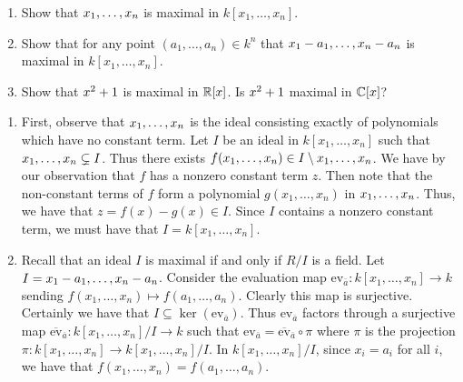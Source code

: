 \documentclass[letterpaper, 11pt, oneside]{book}
\begin{document}
\begin{exercise}\label{ex:UAG_1.1.9}
  \begin{enumerate}[label= (\alph*)]
    \item Show that $\ideal{x_{1}, \ldots, x_{n}}$ is maximal in $k[x_{1}, \ldots, x_{n}]$.
    \item Show that for any point $(a_{1}, \ldots, a_{n}) \in k^{n}$ that $\ideal{x_{1} - a_{1}, \ldots, x_{n} - a_{n}}$ is maximal in $k[x_{1}, \ldots, x_{n}]$.
    \item Show that $\ideal{x^{2} + 1}$ is maximal in $\mathbb{R}[x]$.
          Is $\ideal{x^{2} + 1}$ maximal in $\mathbb{C}[x]$?
  \end{enumerate}
\end{exercise}
\begin{pf}
  \begin{enumerate}[label= (\alph*)]
    \item First, observe that $\ideal{x_{1}, \ldots, x_{n}}$ is the ideal consisting exactly of polynomials which have no constant term.
          Let $I$ be an ideal in $k[x_{1}, \ldots, x_{n}]$ such that $\ideal{x_{1}, \ldots, x_{n}} \subsetneq I$.
          Thus there exists $f(x_{1}, \ldots, x_{n}) \in I \setminus \ideal{x_{1}, \ldots, x_{n}}$.
          We have by our observation that $f$ has a nonzero constant term $z$.
          Then note that the non-constant terms of $f$ form a polynomial $g(x_{1}, \ldots, x_{n})$ in $\ideal{x_{1}, \ldots, x_{n}}$.
          Thus, we have that $z = f(x) - g(x) \in I$.
          Since $I$ contains a nonzero constant term, we must have that $I = k[x_{1}, \ldots, x_{n}]$.
    \item Recall that an ideal $I$ is maximal if and only if $R/I$ is a field.
          Let $I = \ideal{x_{1} - a_{1}, \ldots, x_{n} - a_{n}}$.
          Consider the evaluation map $\text{ev}_{\overline{a}}\colon k[x_{1}, \ldots, x_{n}] \to k$ sending $f(x_{1}, \ldots, x_{n}) \mapsto f(a_{1}, \ldots, a_{n})$.
          Clearly this map is surjective.
          Certainly we have that $I \subseteq \ker(\text{ev}_{\overline{a}})$.
          Thus $\text{ev}_{\overline{a}}$ factors through a surjective map $\overline{\text{ev}}_{\overline{a}}\colon k[x_{1}, \ldots, x_{n}]/I \to k$ such that $\text{ev}_{\overline{a}} = \overline{\text{ev}}_{\overline{a}} \circ \pi$ where $\pi$ is the projection $\pi\colon k[x_{1}, \ldots, x_{n}] \to k[x_{1}, \ldots, x_{n}] / I$.
          In $k[x_{1}, \ldots, x_{n}] / I$, since $x_{i} = a_{i}$ for all $i$, we have that $f(x_{1}, \ldots, x_{n}) = f(a_{1}, \ldots, a_{n})$.

\end{enumerate}
\end{pf}
\end{document}
